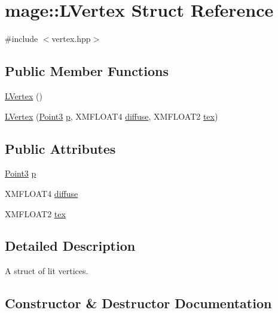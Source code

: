 \hypertarget{structmage_1_1_l_vertex}{}\section{mage\+:\+:L\+Vertex Struct Reference}
\label{structmage_1_1_l_vertex}


{\ttfamily \#include $<$vertex.\+hpp$>$}

\subsection*{Public Member Functions}
\begin{DoxyCompactItemize}
\item 
\hyperlink{structmage_1_1_l_vertex_abfc69fb38d5f37b07d1c420a23a3e7f9}{L\+Vertex} ()
\item 
\hyperlink{structmage_1_1_l_vertex_a20fadd716aaa40041001839437fbb7cf}{L\+Vertex} (\hyperlink{structmage_1_1_point3}{Point3} \hyperlink{structmage_1_1_l_vertex_aa757bf891210af126ff9fca970aa843d}{p}, X\+M\+F\+L\+O\+A\+T4 \hyperlink{structmage_1_1_l_vertex_abfe65c089e650ad20ed41de8e2b585dd}{diffuse}, X\+M\+F\+L\+O\+A\+T2 \hyperlink{structmage_1_1_l_vertex_abeca49c231f9b85063dbd4c0522d7edc}{tex})
\end{DoxyCompactItemize}
\subsection*{Public Attributes}
\begin{DoxyCompactItemize}
\item 
\hyperlink{structmage_1_1_point3}{Point3} \hyperlink{structmage_1_1_l_vertex_aa757bf891210af126ff9fca970aa843d}{p}
\item 
X\+M\+F\+L\+O\+A\+T4 \hyperlink{structmage_1_1_l_vertex_abfe65c089e650ad20ed41de8e2b585dd}{diffuse}
\item 
X\+M\+F\+L\+O\+A\+T2 \hyperlink{structmage_1_1_l_vertex_abeca49c231f9b85063dbd4c0522d7edc}{tex}
\end{DoxyCompactItemize}


\subsection{Detailed Description}
A struct of lit vertices. 

\subsection{Constructor \& Destructor Documentation}
\hypertarget{structmage_1_1_l_vertex_abfc69fb38d5f37b07d1c420a23a3e7f9}{}\label{structmage_1_1_l_vertex_abfc69fb38d5f37b07d1c420a23a3e7f9} 
